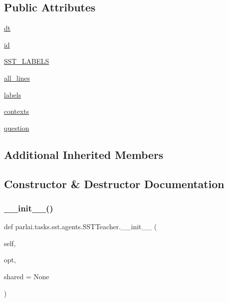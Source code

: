 \subsection*{Public Attributes}
\begin{DoxyCompactItemize}
\item 
\hyperlink{classparlai_1_1tasks_1_1sst_1_1agents_1_1SSTTeacher_a6569a040ff7272f78becaf53b50758df}{dt}
\item 
\hyperlink{classparlai_1_1tasks_1_1sst_1_1agents_1_1SSTTeacher_a620fc9e36feee1916bec41e01449421b}{id}
\item 
\hyperlink{classparlai_1_1tasks_1_1sst_1_1agents_1_1SSTTeacher_aae023784a28998142cbaac66d9ebb1ff}{S\+S\+T\+\_\+\+L\+A\+B\+E\+LS}
\item 
\hyperlink{classparlai_1_1tasks_1_1sst_1_1agents_1_1SSTTeacher_a555e131fc76d2c8b1ac08171f677e969}{all\+\_\+lines}
\item 
\hyperlink{classparlai_1_1tasks_1_1sst_1_1agents_1_1SSTTeacher_ab9c4dcb4b8b2b2e753dc53400bd4fdd9}{labels}
\item 
\hyperlink{classparlai_1_1tasks_1_1sst_1_1agents_1_1SSTTeacher_aec692483a930bc8463105457142ef84b}{contexts}
\item 
\hyperlink{classparlai_1_1tasks_1_1sst_1_1agents_1_1SSTTeacher_a8c33e7285f005f10ada92d3207d61399}{question}
\end{DoxyCompactItemize}
\subsection*{Additional Inherited Members}


\subsection{Constructor \& Destructor Documentation}
\mbox{\label{classparlai_1_1tasks_1_1sst_1_1agents_1_1SSTTeacher_ad16c8f7acfe2dde86cc77eb9047c465f}} 
\subsubsection{\texorpdfstring{\+\_\+\+\_\+init\+\_\+\+\_\+()}{\_\_init\_\_()}}
{\footnotesize\ttfamily def parlai.\+tasks.\+sst.\+agents.\+S\+S\+T\+Teacher.\+\_\+\+\_\+init\+\_\+\+\_\+ (\begin{DoxyParamCaption}\item[{}]{self,  }\item[{}]{opt,  }\item[{}]{shared = {\ttfamily None} }\end{DoxyParamCaption})}



